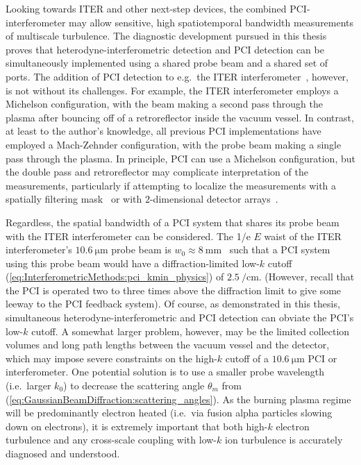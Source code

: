Looking towards ITER and other next-step devices,
the combined PCI-interferometer may allow
sensitive, high spatiotemporal bandwidth measurements
of multiscale turbulence.
The diagnostic development pursued in this thesis
proves that heterodyne-interferometric detection and PCI detection
can be simultaneously implemented
using a shared probe beam and
a shared set of ports.
The addition of PCI detection to
e.g.\ the ITER interferometer~\cite{vanzeeland_TIP_rsi13}, however,
is not without its challenges.
For example, the ITER interferometer
employs a Michelson configuration,
with the beam making a second pass through the plasma
after bouncing off of a retroreflector inside the vacuum vessel.
In contrast,
at least to the author's knowledge,
all previous PCI implementations
have employed a Mach-Zehnder configuration,
with the probe beam making a single pass through the plasma.
In principle, PCI can use a Michelson configuration, but
the double pass and retroreflector
may complicate interpretation of the measurements,
particularly if attempting to localize the measurements
with a spatially filtering mask~\cite{dorris_rsi09, dorris_phd, lin_rsi06} or
with $2$-dimensional detector arrays~\cite{sanin_rsi04, tanaka_rsi16}.

Regardless, the spatial bandwidth of a PCI system
that shares its probe beam
with the ITER interferometer can be considered.
The 1/e $E$ waist of the ITER interferometer's
$\SI{10.6}{\micro\meter}$ probe beam is
$w_0 \approx \SI{8}{\milli\meter}$~\cite{vanzeeland_TIP_rsi13}
such that a PCI system using this probe beam
would have a diffraction-limited low-$k$ cutoff
(\ref{eq:InterferometricMethods:pci_kmin_physics})
of $\SI{2.5}{\per\centi\meter}$.
(However, recall that the \diiid\space PCI
is operated two to three times above the diffraction limit
to give some leeway to the PCI feedback system).
Of course, as demonstrated in this thesis,
simultaneous heterodyne-interferometric and PCI detection
can obviate the PCI's low-$k$ cutoff.
A somewhat larger problem, however, may be the limited collection volumes
and long path lengths
between the vacuum vessel and the detector, which
may impose severe constraints
on the high-$k$ cutoff of a $\SI{10.6}{\micro\meter}$ PCI or interferometer.
One potential solution is to use a smaller probe wavelength
(i.e.\ larger $k_0$) to decrease the scattering angle $\theta_m$ from
(\ref{eq:GaussianBeamDiffraction:scattering_angles}).
As the burning plasma regime will be predominantly electron heated
(i.e.\ via fusion alpha particles slowing down on electrons),
it is extremely important that
both high-$k$ electron turbulence and
any cross-scale coupling with low-$k$ ion turbulence
is accurately diagnosed and understood.




